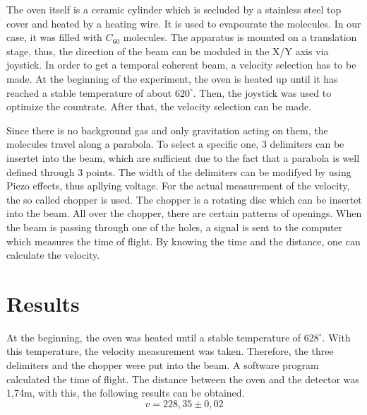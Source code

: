 \documentclass[12pt,a4paper]{article}
\begin{document}
\begin{multicols}{2}
The oven itself is a ceramic cylinder which is secluded by a stainless steel top cover and heated by a heating wire. It is used to evapourate the molecules. In our case, it was filled with $C_{60}$ molecules. The apparatus is mounted on a translation stage, thus, the direction of the beam can be moduled in the X/Y axis via joystick.
In order to get a temporal coherent beam, a velocity selection has to be made. 
At the beginning of the experiment, the oven is heated up until it has reached a stable temperature of about $620^\circ$. Then, the joystick was used to optimize the countrate. After that, the velocity selection can be made.

Since there is no background gas and only gravitation acting on them, the molecules travel along a parabola. To select a specific one, 3 delimiters can be insertet into the beam, which are sufficient due to the fact that a parabola is well defined through 3 points. The width of the delimiters can be modifyed by using Piezo effects, thus apllying voltage. 
For the actual measurement of the velocity, the so called chopper is used. The chopper is a rotating disc which can be insertet into the beam. All over the chopper, there are certain patterns of openings. When the beam is passing through one of the holes, a signal is sent to the computer which measures the time of flight. By knowing the time and the distance, one can calculate the velocity. 


\section{Results}
At the beginning, the oven was heated until a stable temperature of $628^\circ$. With this temperature, the velocity measurement was taken. Therefore, the three delimiters and the chopper were put into the beam. A software program calculated the time of flight. The distance between the oven and the detector was 1,74m, with this, the following results can be obtained.
$$v=228,35\pm0,02$$



\end{multicols}
\end{document}
